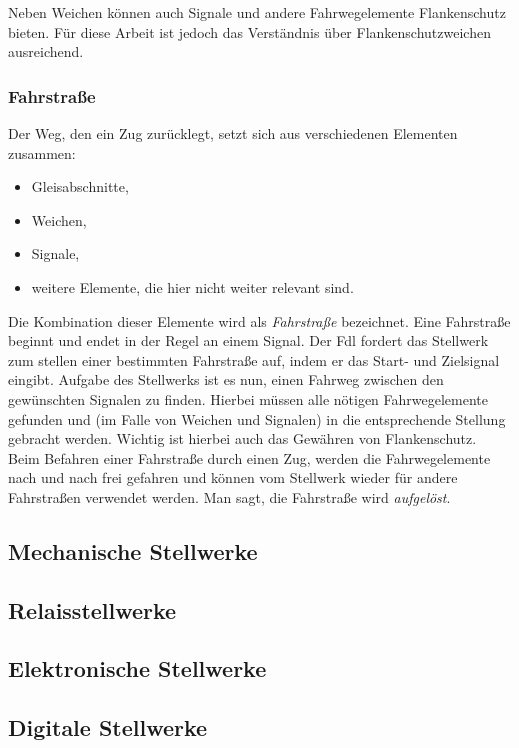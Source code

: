 Neben Weichen können auch Signale und andere Fahrwegelemente Flankenschutz bieten. Für diese Arbeit ist jedoch das Verständnis über Flankenschutzweichen ausreichend.

\subsubsection*{Fahrstraße}\label{text:Grundlagen:Stellwerkstechnik:Sicherung-des-Schienenverkehrs:Fahrstrasse}

Der Weg, den ein Zug zurücklegt, setzt sich aus verschiedenen Elementen zusammen:

\begin{itemize}
    \item Gleisabschnitte,
    \item Weichen,
    \item Signale,
    \item weitere Elemente, die hier nicht weiter relevant sind.
\end{itemize}

Die Kombination dieser Elemente wird als \textit{Fahrstraße} bezeichnet. Eine Fahrstraße beginnt und endet in der Regel an einem Signal. Der \ac{Fdl} fordert das Stellwerk zum stellen einer bestimmten Fahrstraße auf, indem er das Start- und Zielsignal eingibt. Aufgabe des Stellwerks ist es nun, einen Fahrweg zwischen den gewünschten Signalen zu finden. Hierbei müssen alle nötigen Fahrwegelemente gefunden und (im Falle von Weichen und Signalen) in die entsprechende Stellung gebracht werden. Wichtig ist hierbei auch das Gewähren von Flankenschutz. Beim Befahren einer Fahrstraße durch einen Zug, werden die Fahrwegelemente nach und nach frei gefahren und können vom Stellwerk wieder für andere Fahrstraßen verwendet werden. Man sagt, die Fahrstraße wird \textit{aufgelöst}.

\subsection{Mechanische Stellwerke}\label{text:Grundlagen:Stellwerkstechnik:Mechanische-Stellwerke}

\subsection{Relaisstellwerke}\label{text:Grundlagen:Stellwerkstechnik:Relaisstellwerke}

\subsection{Elektronische Stellwerke}\label{text:Grundlagen:Stellwerkstechnik:Elektronische-Stellwerke}

\subsection{Digitale Stellwerke}\label{text:Grundlagen:Stellwerkstechnik:Digitale-Stellwerke}
